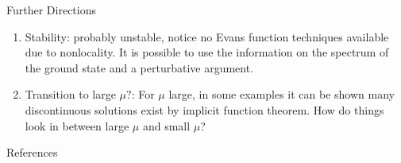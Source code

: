 \documentclass[final]{beamer}
\newlength{\onecolwid}
\begin{document}
\begin{frame}[t]
\begin{columns}[t]
\begin{column}{\onecolwid}

\begin{block}{Further Directions}

\begin{enumerate}
\item Stability: probably unstable, notice no Evans function techniques available due to nonlocality. It is possible to use the information on the spectrum of the ground state and a perturbative argument.


\item Transition to large $\mu ?$: For $\mu$ large, in some examples it can be shown many discontinuous solutions exist by implicit function theorem. How do things look in between large $\mu$ and small $\mu$?
\end{enumerate}

\end{block}


\begin{block}{References}

\nocite{*} %
\small{
\vspace{0.75in}}

\end{block}






\end{column}
\end{columns}
\end{frame}
\end{document}
